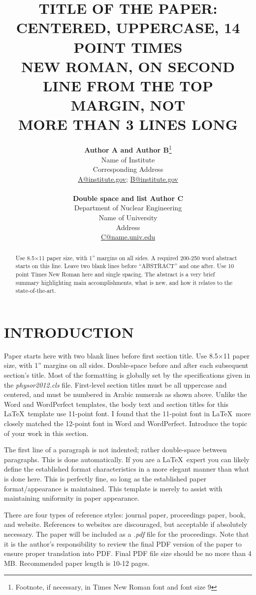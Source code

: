 \documentclass{physor2012}
\title{TITLE OF THE PAPER: CENTERED, UPPERCASE, 14 POINT TIMES \\
  NEW ROMAN, ON SECOND LINE FROM THE TOP MARGIN, NOT \\
  MORE THAN 3 LINES LONG}
\author{%
  \textbf{Author A and Author B}\footnote{Footnote, if necessary, in Times New Roman font and font size 9} \\
  Name of Institute  \\
  Corresponding Address \\
  \url{A@institute.gov}; \url{B@institute.gov} \\
  \\
  \textbf{Double space and list Author C} \\
  Department of Nuclear Engineering  \\
  Name of University \\
  Address \\
  \url{C@name.univ.edu}
}
\begin{document}
\maketitle
\begin{abstract}
  Use 8.5$\times$11 paper size, with 1'' margins on all sides.  A required 200-250 
  word abstract starts on this line.  Leave two blank lines before ``ABSTRACT''
  and one after.  Use 10 point Times New Roman here and single 
  spacing. The abstract is a very brief summary highlighting main 
  accomplishments, what is new, and how it relates to the state-of-the-art.
\end{abstract}
%
\section{INTRODUCTION} 
Paper starts here with two blank lines before first section title.  Use 
8.5$\times$11 paper size, with 1'' margins on all sides.  Double-space before and
after each subsequent section's title.  Most of the formatting is globally
set by the specifications given in the \emph{physor2012.cls} file.  
First-level section titles must be all uppercase and centered, and must 
be numbered in Arabic numerals as shown above.  Unlike the Word and WordPerfect
templates, the body text and section titles for this \LaTeX\ template use 
11-point font.  I found that the 11-point font in \LaTeX\ more closely 
matched the 12-point font in Word and WordPerfect.  Introduce the topic of your work in this section.

The first line of a paragraph is not indented; rather double-space between 
paragraphs.  This is done automatically. If you are a \LaTeX\ expert you 
can likely define the established format characteristics in a more elegant 
manner than what is done here.  This is perfectly fine, so long as the 
established paper format/appearance is maintained.  This template is merely 
to assist with maintaining uniformity in paper appearance.

There are four types of reference styles: journal paper\cite{journal}, 
proceedings paper\cite{proc_paper}, book\cite{book}, and website\cite{website}.
References to websites are discouraged, but acceptable if absolutely necessary.
The paper will be included as a \emph{.pdf} file for the proceedings. Note that 
it is the author's responsibility to review the final PDF version of the paper
to ensure proper translation into PDF.  Final PDF file size should be no more 
than 4 MB.  Recommended paper length is 10-12 pages.
%
\end{document}
